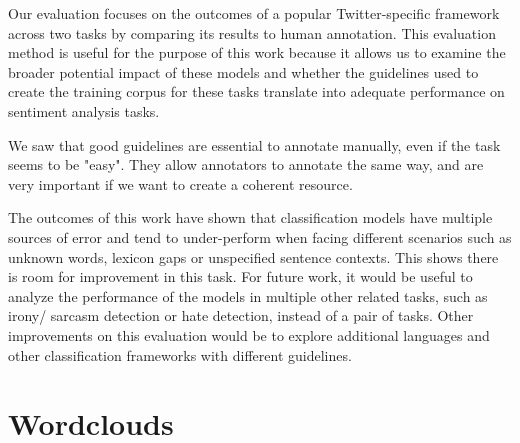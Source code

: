 \documentclass[11pt,a4paper]{article}
\begin{document}
Our evaluation focuses on the outcomes of a popular Twitter-specific framework across two tasks by comparing its results to human annotation. This evaluation method is useful for the purpose of this work because it allows us to examine the broader potential impact of these models and whether the guidelines used to create the training corpus for these tasks translate into adequate performance on sentiment analysis tasks.

We saw that good guidelines are essential to annotate manually, even if the task seems to be "easy". They allow annotators to annotate the same way, and are very important if we want to create a coherent resource. 

The outcomes of this work have shown that classification models have multiple sources of error and tend to under-perform when facing different scenarios such as unknown words, lexicon gaps or unspecified sentence contexts. This shows there is room for improvement in this task. For future work, it would be useful to analyze the performance of the models in multiple other related tasks, such as irony/ sarcasm detection or hate detection, instead of a pair of tasks. Other improvements on this evaluation would be to explore additional languages and other classification frameworks with different guidelines.

\clearpage




\appendix

\section{Wordclouds}
\label{app:wordclouds}
\end{document}
